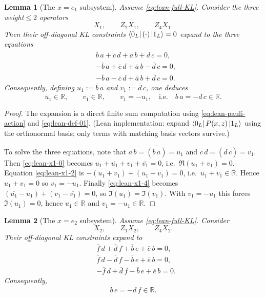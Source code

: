 \documentclass[11pt]{article}
\newtheorem{lemma}{Lemma}
\begin{document}
\begin{lemma}[The $x=e_1$ subsystem]
\label{lem:lean-x1}
Assume \eqref{eq:lean-full-KL}. Consider the three weight$\le 2$ operators
\[
X_1,\qquad Z_2X_1,\qquad Z_4X_1.
\]
Then their off-diagonal KL constraints $\bra{0_L}(\cdot)\ket{1_L}=0$ expand to the three equations
\begin{align}
&\overline b\,a+\overline c\,d+\overline a\,b+\overline d\,c=0,
\label{eq:lean-x1-0}\\
&-\overline b\,a+\overline c\,d+\overline a\,b-\overline d\,c=0,
\label{eq:lean-x1-2}\\
&-\overline b\,a-\overline c\,d+\overline a\,b+\overline d\,c=0.
\label{eq:lean-x1-4}
\end{align}
Consequently, defining $u_1:=\overline b\,a$ and $v_1:=\overline d\,c$, one deduces
\begin{equation}
u_1\in\mathbb R,\qquad v_1\in\mathbb R,\qquad v_1=-u_1,
\quad\text{i.e.}\quad
\overline b\,a=-\overline d\,c\in\mathbb R.
\label{eq:lean-prod1}
\end{equation}
\end{lemma}

\begin{proof}
The expansion is a direct finite sum computation using \eqref{eq:lean-pauli-action} and \eqref{eq:lean-def-01}.
(Lean implementation: expand $\bra{0_L}P(x,z)\ket{1_L}$ using the orthonormal basis; only terms with matching basis vectors survive.)

To solve the three equations, note that $\overline a\,b=\overline{(\overline b\,a)}=\overline{u_1}$
and $\overline c\,d=\overline{(\overline d\,c)}=\overline{v_1}$. Then \eqref{eq:lean-x1-0} becomes
$u_1+\overline{u_1}+v_1+\overline{v_1}=0$, i.e.\ $\Re(u_1+v_1)=0$.
Equation \eqref{eq:lean-x1-2} is $-(u_1+v_1)+\overline{(u_1+v_1)}=0$, i.e.\ $u_1+v_1\in\mathbb R$.
Hence $u_1+v_1=0$ so $v_1=-u_1$.
Finally \eqref{eq:lean-x1-4} becomes $(\overline{u_1}-u_1)+ (v_1-\overline{v_1})=0$,
so $\Im(u_1)=\Im(v_1)$. With $v_1=-u_1$ this forces $\Im(u_1)=0$, hence $u_1\in\mathbb R$ and $v_1=-u_1\in\mathbb R$.
\end{proof}

\begin{lemma}[The $x=e_2$ subsystem]
\label{lem:lean-x2}
Assume \eqref{eq:lean-full-KL}. Consider
\[
X_2,\qquad Z_1X_2,\qquad Z_4X_2.
\]
Their off-diagonal KL constraints expand to
\begin{align}
&\overline f\,d+\overline d\,f+\overline b\,e+\overline e\,b=0,
\label{eq:lean-x2-0}\\
&\overline f\,d-\overline d\,f-\overline b\,e+\overline e\,b=0,
\label{eq:lean-x2-1}\\
&-\overline f\,d+\overline d\,f-\overline b\,e+\overline e\,b=0.
\label{eq:lean-x2-4}
\end{align}
Consequently,
\begin{equation}
\overline b\,e=-\overline d\,f\in\mathbb R.
\label{eq:lean-prod2}
\end{equation}
\end{lemma}
\end{document}
